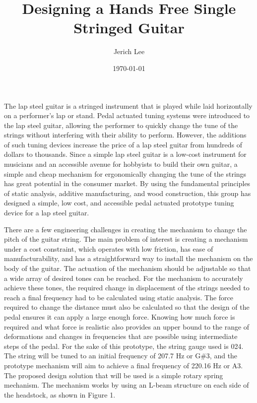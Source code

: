\documentclass[12pt]{article}
\title{Designing a Hands Free Single Stringed Guitar}
\author{Jerich Lee}
\date{\today}
\theoremstyle{definition} %
\theoremstyle{plain} %
\begin{document}
\maketitle
The lap steel guitar is a stringed instrument that is played while laid horizontally on a
performer’s lap or stand. Pedal actuated tuning systems were introduced to the lap steel guitar,
allowing the performer to quickly change the tune of the strings without interfering with their ability
to perform. However, the additions of such tuning devices increase the price of a lap steel guitar
from hundreds of dollars to thousands. Since a simple lap steel guitar is a low-cost instrument for
musicians and an accessible avenue for hobbyists to build their own guitar, a simple and cheap
mechanism for ergonomically changing the tune of the strings has great potential in the consumer
market. By using the fundamental principles of static analysis, additive manufacturing, and wood
construction, this group has designed a simple, low cost, and accessible pedal actuated prototype
tuning device for a lap steel guitar.

There are a few engineering challenges in creating the mechanism to change the pitch of the
guitar string. The main problem of interest is creating a mechanism under a cost constraint, which
operates with low friction, has ease of manufacturability, and has a straightforward way to install the
mechanism on the body of the guitar. The actuation of the mechanism should be adjustable so that a
wide array of desired tones can be reached. For the mechanism to accurately achieve these tones, the
required change in displacement of the strings needed to reach a final frequency had to be calculated
using static analysis. The force required to change the distance must also be calculated so that the
design of the pedal ensures it can apply a large enough force. Knowing how much force is required
and what force is realistic also provides an upper bound to the range of deformations and changes in
frequencies that are possible using intermediate steps of the pedal. For the sake of this prototype,
the string gauge used is 024. The string will be tuned to an initial frequency of 207.7 Hz or G\#3, and
the prototype mechanism will aim to achieve a final frequency of 220.16 Hz or A3.
The proposed design solution that will be used is a simple rotary spring mechanism. The
mechanism works by using an L-beam structure on each side of the headstock, as shown in Figure 1.
\end{document}
